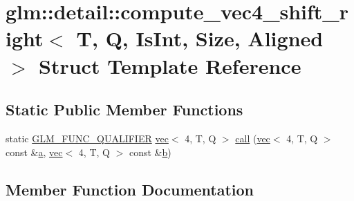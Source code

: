\hypertarget{structglm_1_1detail_1_1compute__vec4__shift__right}{}\section{glm\+:\+:detail\+:\+:compute\+\_\+vec4\+\_\+shift\+\_\+right$<$ T, Q, Is\+Int, Size, Aligned $>$ Struct Template Reference}
\label{structglm_1_1detail_1_1compute__vec4__shift__right}
\subsection*{Static Public Member Functions}
\begin{DoxyCompactItemize}
\item 
static \mbox{\hyperlink{setup_8hpp_a33fdea6f91c5f834105f7415e2a64407}{G\+L\+M\+\_\+\+F\+U\+N\+C\+\_\+\+Q\+U\+A\+L\+I\+F\+I\+ER}} \mbox{\hyperlink{structglm_1_1vec}{vec}}$<$ 4, T, Q $>$ \mbox{\hyperlink{structglm_1_1detail_1_1compute__vec4__shift__right_a8af4802653b2525d63fd1bc5fcd4f32e}{call}} (\mbox{\hyperlink{structglm_1_1vec}{vec}}$<$ 4, T, Q $>$ const \&\mbox{\hyperlink{_s_d_l__opengl__glext_8h_a3309789fc188587d666cda5ece79cf82}{a}}, \mbox{\hyperlink{structglm_1_1vec}{vec}}$<$ 4, T, Q $>$ const \&\mbox{\hyperlink{_s_d_l__opengl__glext_8h_a0f71581a41fd2264c8944126dabbd010}{b}})
\end{DoxyCompactItemize}


\subsection{Member Function Documentation}
\mbox{\label{structglm_1_1detail_1_1compute__vec4__shift__right_a8af4802653b2525d63fd1bc5fcd4f32e}} 
